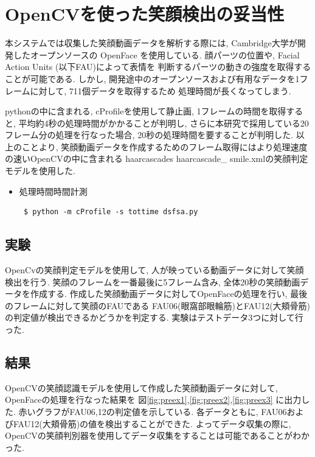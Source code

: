 \section{OpenCVを使った笑顔検出の妥当性}
本システムでは収集した笑顔動画データを解析する際には, Cambridge大学が開発したオープンソースの
OpenFace を使用している. 顔パーツの位置や, Facial Action Units (以下FAU)によって表情を
判断するパーツの動きの強度を取得することが可能である.
しかし, 開発途中のオープンソースおよび有用なデータを1フレームに対して, 711個データを取得するため
処理時間が長くなってしまう.

pythonの中に含まれる, cProfileを使用して静止画,
1フレームの時間を取得すると, 平均約4秒の処理時間がかかることが判明し, さらに本研究で採用している20フレーム分の処理を行なった場合,
20秒の処理時間を要することが判明した.
以上のことより, 笑顔動画データを作成するためのフレーム取得にはより処理速度の速いOpenCVの中に含まれる
haarcascades\/ haarcascade\_ smile.xmlの笑顔判定モデルを使用した.

 \begin{itemize}
   \setlength{\parskip}{20pt}      %
 \item 処理時間時間計測
 \begin{lstlisting}
 $ python -m cProfile -s tottime dsfsa.py
 \end{lstlisting}
 \end{itemize}

\subsection{実験}
OpenCvの笑顔判定モデルを使用して, 人が映っている動画データに対して笑顔検出を行う.
笑顔のフレームを一番最後に5フレーム含み, 全体20秒の笑顔動画データを作成する.
作成した笑顔動画データに対してOpenFaceの処理を行い, 最後のフレームに対して笑顔のFAUである
FAU06(眼窩部眼輪筋)とFAU12(大頬骨筋)の判定値が検出できるかどうかを判定する.
実験はテストデータ3つに対して行った.

\subsection{結果}
OpenCVの笑顔認識モデルを使用して作成した笑顔動画データに対して, OpenFaceの処理を行なった結果を
図\ref{fig:preex1},\ref{fig:preex2},\ref{fig:preex3} に出力した.
赤いグラフがFAU06,12の判定値を示している.
各データともに, FAU06およびFAU12(大頬骨筋)の値を検出することができた.
よってデータ収集の際に, OpenCVの笑顔判別器を使用してデータ収集をすることは可能であることがわかった.


